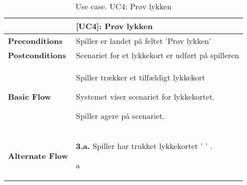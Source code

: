 \documentclass[class=article, crop=false]{standalone}
\begin{document}
    \begin{table}[H]
        \caption{Use case. UC4: Prøv lykken}
        \begin{tabularx}{\textwidth}{|l|X|}
            \hline
            & \textbf{[UC4]: Prøv lykken}   \\ \hline
            \textbf{Preconditions}       & Spiller er landet på feltet 'Prøv lykken'\\ \hline
            \textbf{Postconditions}      & Scenariet for et lykkekort er udført på spilleren\\ \hline


            \textbf{Basic Flow} & \begin{tabenum}
                                      \item Spiller trækker et tilfældigt lykkekort
                                      \item Systemet viser scenariet for lykkekortet.
                                      \item Spiller agere på scenariet.
            \end{tabenum}   \\ \hline




            \textbf{Alternate Flow}   & \textbf{3.a.} Spiller har trukket lykkekortet ' ' .
            \begin{enumerate} \begin{tabenum}
                                  \item a
            \end{tabenum} \end{enumerate}
            \\



            \hline

        \end{tabularx}


    \end{table}
\end{document}
